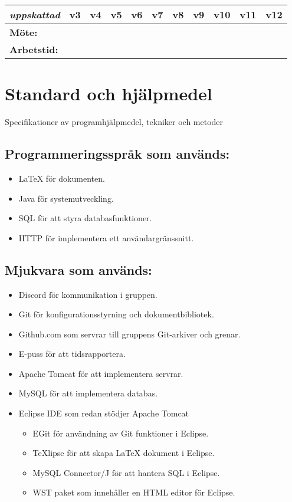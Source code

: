 \documentclass[paper=a4, fontsize=11pt,twoside]{article}
\begin{document}
\begin{tabular}{| l | c | c | c | c | c | c | c | c | c | c |}
\hline
\textit{uppskattad} & \textbf{v3} & \textbf{v4} & \textbf{v5} & \textbf{v6} & \textbf{v7} & \textbf{v8} & \textbf{v9} & \textbf{v10} & \textbf{v11} & \textbf{v12}\\
\hline
\textbf{Möte:} & & & & & & & & & & \\
\hline
\textbf{Arbetstid:} & & & & & & & & & & \\
\hline
\end{tabular}

\section{Standard och hjälpmedel}
Specifikationer av programhjälpmedel, tekniker och metoder

\subsection*{Programmeringsspråk som används:}
	\begin{itemize}
	\item LaTeX för dokumenten.
	\item Java för systemutveckling.
	\item SQL för att styra databasfunktioner.
	\item HTTP för implementera ett användargränssnitt.
	\end{itemize}

\subsection*{Mjukvara som används:}
	\begin{itemize}
	\item Discord för kommunikation i gruppen.
	\item Git för konfigurationsstyrning och dokumentbibliotek.
	\item Github.com som servrar till gruppens Git-arkiver och grenar.
	\item E-puss för att tidsrapportera.
	\item Apache Tomcat för att implementera servrar.
	\item MySQL för att implementera databas.
	\item Eclipse IDE som redan stödjer Apache Tomcat
		\begin{itemize}
		\item EGit för användning av Git funktioner i Eclipse.
		\item TeXlipse för att skapa LaTeX dokument i Eclipse.
		\item MySQL Connector/J för att hantera SQL i Eclipse.
		\item WST paket som innehåller en HTML editor för Eclipse. 
		\end{itemize}
	\end{itemize}
\end{document}
